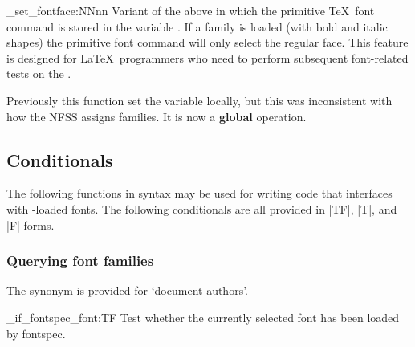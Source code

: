 \documentclass[a4paper]{l3doc}
\begin{document}
\begin{macro}{\fontspec_set_fontface:NNnn}
Variant of the above in which the primitive \TeX\ font command is stored in
the variable .
If a family is loaded (with bold and italic shapes) the primitive font
command will only select the regular face.
This feature is designed for \LaTeX\ programmers who need to
perform subsequent font-related tests on the .

Previously this function set the  variable locally, but this was inconsistent
with how the NFSS assigns families. It is now a \textbf{global} operation.
\end{macro}


\subsection{Conditionals}

The following functions in  syntax may be used
for writing code that interfaces with -loaded fonts.
The following conditionals are all provided in |TF|, |T|, and |F| forms.

\subsubsection{Querying font families}

The synonym  is provided for `document authors'.


\begin{macro}{\fontspec_if_fontspec_font:TF}
Test whether the currently selected font has been loaded by fontspec.
\end{macro}
\end{document}
